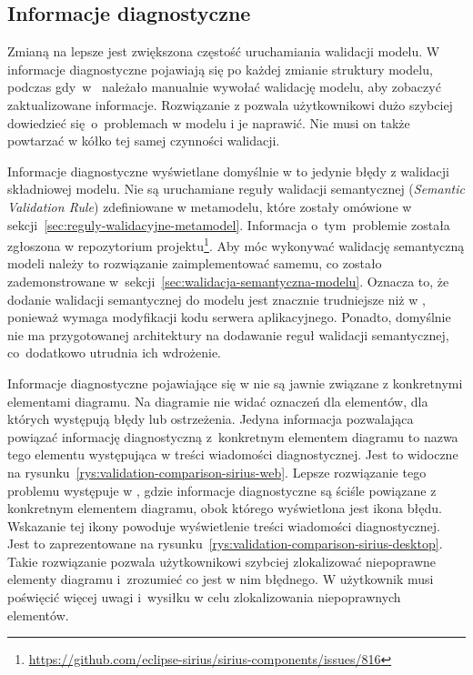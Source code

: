 \subsection{Informacje diagnostyczne}

Zmianą na lepsze jest zwiększona częstość uruchamiania walidacji
modelu. W \SiriusWeb{} informacje diagnostyczne pojawiają się po każdej
zmianie struktury modelu, podczas gdy~w~\SiriusDesktop{} należało
manualnie wywołać walidację modelu, aby zobaczyć zaktualizowane informacje.
Rozwiązanie z \SiriusWeb{} pozwala użytkownikowi dużo szybciej dowiedzieć
się~o~problemach w modelu i je naprawić. Nie musi on także powtarzać w kółko
tej samej czynności walidacji.

Informacje diagnostyczne wyświetlane domyślnie w \SiriusWeb{} to jedynie
błędy z walidacji składniowej modelu. Nie są uruchamiane reguły walidacji
semantycznej (\emph{Semantic Validation Rule}) zdefiniowane w metamodelu, które
zostały omówione w sekcji~\ref{sec:reguly-walidacyjne-metamodel}. Informacja
o~tym~problemie została zgłoszona w repozytorium projektu\footnote{
	\url{https://github.com/eclipse-sirius/sirius-components/issues/816}}.
Aby móc wykonywać walidację semantyczną modeli należy to rozwiązanie
zaimplementować samemu, co zostało zademonstrowane
w~sekcji~\ref{sec:walidacja-semantyczna-modelu}.
Oznacza to, że dodanie walidacji semantycznej do modelu jest znacznie
trudniejsze niż w \SiriusDesktop{}, ponieważ wymaga modyfikacji kodu
serwera aplikacyjnego. Ponadto, domyślnie nie ma przygotowanej architektury na
dodawanie reguł walidacji semantycznej, co~dodatkowo utrudnia ich wdrożenie.

Informacje diagnostyczne pojawiające się w \SiriusWeb{} nie są
jawnie związane z konkretnymi elementami diagramu. Na diagramie nie widać
oznaczeń dla elementów, dla których występują błędy lub ostrzeżenia. Jedyna
informacja pozwalająca powiązać informację diagnostyczną z~konkretnym elementem
diagramu to nazwa tego elementu występująca w treści wiadomości diagnostycznej.
Jest to widoczne na rysunku~\ref{rys:validation-comparison-sirius-web}. Lepsze
rozwiązanie tego problemu występuje w
\SiriusDesktop{}, gdzie informacje diagnostyczne są ściśle powiązane z
konkretnym elementem diagramu, obok którego wyświetlona jest ikona błędu.
Wskazanie tej ikony powoduje wyświetlenie treści wiadomości diagnostycznej.
Jest to zaprezentowane na
rysunku~\ref{rys:validation-comparison-sirius-desktop}.
Takie rozwiązanie pozwala użytkownikowi szybciej zlokalizować niepoprawne
elementy diagramu i~zrozumieć co jest w nim błędnego. W \SiriusWeb{}
użytkownik musi poświęcić więcej uwagi i~wysiłku w celu zlokalizowania
niepoprawnych elementów.

